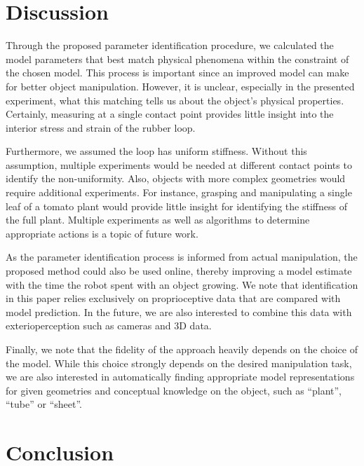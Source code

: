 \documentclass[letterpaper, 10pt, conference]{ieeeconf}
\begin{document}
\section{Discussion}
Through the proposed parameter identification procedure, we calculated the model parameters that best match physical phenomena within the constraint of the chosen model.  This process is important since an improved model can make for better object manipulation.  However, it is unclear, especially in the presented experiment, what this matching tells us about the object's physical properties.  Certainly, measuring at a single contact point provides little insight into the interior stress and strain of the rubber loop.

Furthermore, we assumed the loop has uniform stiffness.  Without this assumption, multiple experiments would be needed at different contact points to identify the non-uniformity.  Also, objects with more complex geometries would require additional experiments.  For instance, grasping and manipulating a single leaf of a tomato plant would provide little insight for identifying the stiffness of the full plant.  Multiple experiments as well as algorithms to determine appropriate actions is a topic of future work.

As the parameter identification process is informed from actual manipulation, the proposed method could also be used online, thereby improving a model estimate with the time the robot spent with an object growing. We note that identification in this paper relies exclusively on proprioceptive data that are compared with model prediction. In the future, we are also interested to combine this data with exterioperception such as cameras and 3D data. 

Finally, we note that the fidelity of the approach heavily depends on the choice of the model. While this choice strongly depends on the desired manipulation task, we are also interested in automatically finding appropriate model representations for given geometries and conceptual knowledge on the object, such as ``plant'', ``tube'' or ``sheet''.  

\section{Conclusion}








\end{document}
